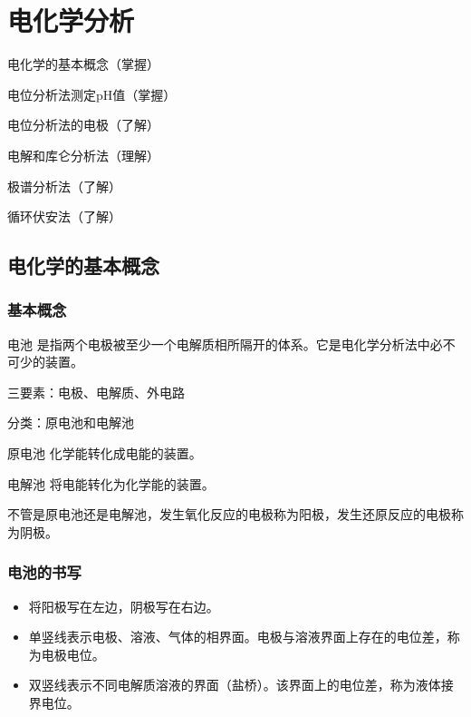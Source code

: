 \chapter{电化学分析}

\begin{introduction}
	\item 电化学的基本概念（掌握）
	\item 电位分析法测定pH值（掌握）
	\item 电位分析法的电极（了解）
	\item 电解和库仑分析法（理解）
	\item 极谱分析法（了解）
	\item 循环伏安法（了解）
\end{introduction}



\section{电化学的基本概念}

\subsection{基本概念}
\begin{definition*}{电池}{}
	是指两个电极被至少一个电解质相所隔开的体系。它是电化学分析法中必不可少的装置。
\end{definition*}
	
三要素：电极、电解质、外电路

分类：原电池和电解池

\begin{definition*}{原电池}{}
	化学能转化成电能的装置。
\end{definition*}

\begin{definition*}{电解池}{}
	将电能转化为化学能的装置。
\end{definition*}

不管是原电池还是电解池，发生氧化反应的电极称为阳极，发生还原反应的电极称为阴极。
\subsection{电池的书写}
\begin{itemize}
	\item 将阳极写在左边，阴极写在右边。
	\item 单竖线表示电极、溶液、气体的相界面。电极与溶液界面上存在的电位差，称为电极电位。
	\item 双竖线表示不同电解质溶液的界面（盐桥）。该界面上的电位差，称为液体接界电位。
\end{itemize}

